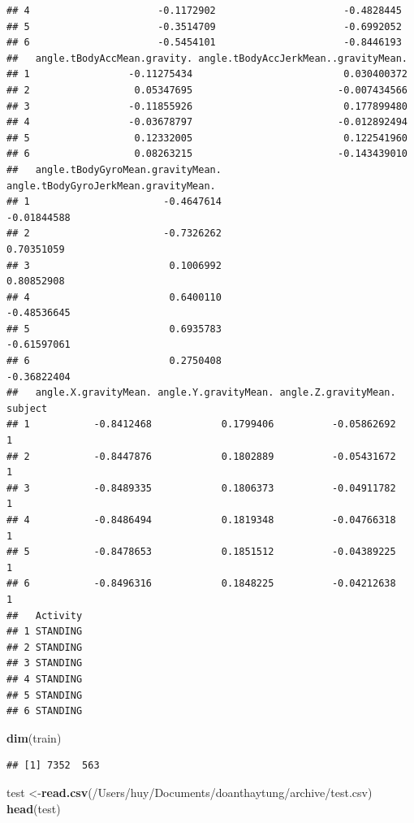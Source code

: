 \documentclass[
]{article}
\newenvironment{Shaded}{\begin{snugshade}}{\end{snugshade}}
\newcommand{\FunctionTok}[1]{\textcolor[rgb]{0.13,0.29,0.53}{\textbf{#1}}}
\newcommand{\NormalTok}[1]{#1}
\newcommand{\OtherTok}[1]{\textcolor[rgb]{0.56,0.35,0.01}{#1}}
\newcommand{\StringTok}[1]{\textcolor[rgb]{0.31,0.60,0.02}{#1}}
\begin{document}
\begin{verbatim}
## 4                      -0.1172902                      -0.4828445
## 5                      -0.3514709                      -0.6992052
## 6                      -0.5454101                      -0.8446193
##   angle.tBodyAccMean.gravity. angle.tBodyAccJerkMean..gravityMean.
## 1                 -0.11275434                          0.030400372
## 2                  0.05347695                         -0.007434566
## 3                 -0.11855926                          0.177899480
## 4                 -0.03678797                         -0.012892494
## 5                  0.12332005                          0.122541960
## 6                  0.08263215                         -0.143439010
##   angle.tBodyGyroMean.gravityMean. angle.tBodyGyroJerkMean.gravityMean.
## 1                       -0.4647614                          -0.01844588
## 2                       -0.7326262                           0.70351059
## 3                        0.1006992                           0.80852908
## 4                        0.6400110                          -0.48536645
## 5                        0.6935783                          -0.61597061
## 6                        0.2750408                          -0.36822404
##   angle.X.gravityMean. angle.Y.gravityMean. angle.Z.gravityMean. subject
## 1           -0.8412468            0.1799406          -0.05862692       1
## 2           -0.8447876            0.1802889          -0.05431672       1
## 3           -0.8489335            0.1806373          -0.04911782       1
## 4           -0.8486494            0.1819348          -0.04766318       1
## 5           -0.8478653            0.1851512          -0.04389225       1
## 6           -0.8496316            0.1848225          -0.04212638       1
##   Activity
## 1 STANDING
## 2 STANDING
## 3 STANDING
## 4 STANDING
## 5 STANDING
## 6 STANDING
\end{verbatim}

\begin{Shaded}
\begin{Highlighting}[]
\FunctionTok{dim}\NormalTok{(train)}
\end{Highlighting}
\end{Shaded}

\begin{verbatim}
## [1] 7352  563
\end{verbatim}

\begin{Shaded}
\begin{Highlighting}[]
\NormalTok{test }\OtherTok{\textless{}{-}}\FunctionTok{read.csv}\NormalTok{(}\StringTok{\textquotesingle{}/Users/huy/Documents/doanthaytung/archive/test.csv\textquotesingle{}}\NormalTok{)}
\FunctionTok{head}\NormalTok{(test)}
\end{Highlighting}
\end{Shaded}
\end{document}
